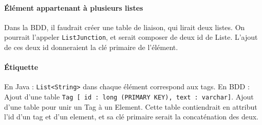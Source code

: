\documentclass[11pt, a4paper]{article}
\begin{document}
\paragraph{Élément appartenant à plusieurs listes}
Dans la BDD, il faudrait créer une table de liaison, qui lirait deux listes. On pourrait l'appeler \verb|ListJunction|, et serait composer de deux id de Liste. L'ajout de ces deux id donneraient la clé primaire de l'élément.

\paragraph{Étiquette} En Java : \verb|List<String>| dans chaque élément correspond aux tags.
En BDD : Ajout d'une table \verb|Tag [ id : long (PRIMARY KEY), text : varchar]|.
Ajout d'une table pour unir un Tag à un Element. Cette table contiendrait en attribut l'id d'un tag et d'un element, et sa clé primaire serait la concaténation des deux.
\end{document}
